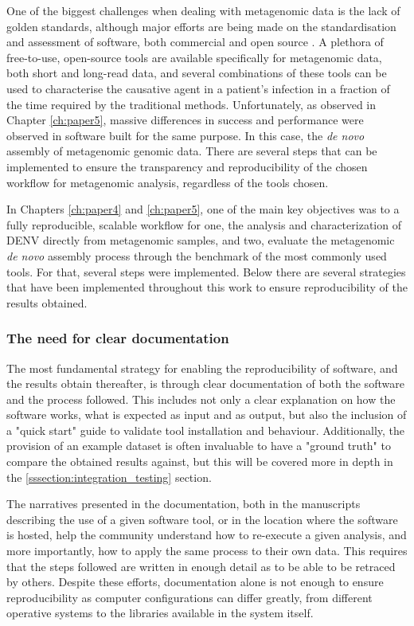 One of the biggest challenges when dealing with metagenomic data is the lack of golden standards, although major efforts are being made on the standardisation and assessment of software, both commercial and open source \citep{angers-loustau_challenges_2018, gruening_recommendations_2019, sczyrba_critical_2017, couto_critical_2018}. A plethora of free-to-use, open-source tools are available specifically for metagenomic data, both short and long-read data, and several combinations of these tools can be used to characterise the causative agent in a patient's infection in a fraction of the time required by the traditional methods. Unfortunately, as observed in Chapter \ref{ch:paper5}, massive differences in success and performance were observed in software built for the same purpose. In this case, the \textit{de novo} assembly of metagenomic genomic data. There are several steps that can be implemented to ensure the transparency and reproducibility of the chosen workflow for metagenomic analysis, regardless of the tools chosen. 

In Chapters \ref{ch:paper4} and \ref{ch:paper5}, one of the main key objectives was to a fully reproducible, scalable workflow for one, the analysis and characterization of \ac{DENV} directly from metagenomic samples, and two, evaluate the metagenomic \textit{de novo} assembly process through the benchmark of the most commonly used tools. For that, several steps were implemented. Below there are several strategies that have been implemented throughout this work to ensure reproducibility of the results obtained. 

\subsubsection{The need for clear documentation}

The most fundamental strategy for enabling the reproducibility of software, and the results obtain thereafter, is through clear documentation of both the software and the process followed. This includes not only a clear explanation on how the software works, what is expected as input and as output, but also the inclusion of a "quick start" guide to validate tool installation and behaviour. Additionally, the provision of an example dataset is often invaluable to have a "ground truth" to compare the obtained results against, but this will be covered more in depth in the \ref{sssection:integration_testing} section. 

The narratives presented in the documentation, both in the manuscripts describing the use of a given software tool, or in the location where the software is hosted, help the community understand how to re-execute a given analysis, and more importantly, how to apply the same process to their own data. This requires that the steps followed are written in enough detail as to be able to be retraced by others. Despite these efforts, documentation alone is not enough to ensure reproducibility as computer configurations can differ greatly, from different operative systems to the libraries available in the system itself. 

